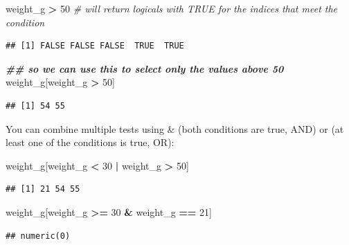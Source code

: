 \documentclass[
]{book}
\newenvironment{Shaded}{\begin{snugshade}}{\end{snugshade}}
\newcommand{\CommentTok}[1]{\textcolor[rgb]{0.56,0.35,0.01}{\textit{#1}}}
\newcommand{\DecValTok}[1]{\textcolor[rgb]{0.00,0.00,0.81}{#1}}
\newcommand{\DocumentationTok}[1]{\textcolor[rgb]{0.56,0.35,0.01}{\textbf{\textit{#1}}}}
\newcommand{\NormalTok}[1]{#1}
\newcommand{\SpecialCharTok}[1]{\textcolor[rgb]{0.81,0.36,0.00}{\textbf{#1}}}
\begin{document}
\begin{Shaded}
\begin{Highlighting}[]
\NormalTok{weight\_g }\SpecialCharTok{\textgreater{}} \DecValTok{50}    \CommentTok{\# will return logicals with TRUE for the indices that meet the condition}
\end{Highlighting}
\end{Shaded}

\begin{verbatim}
## [1] FALSE FALSE FALSE  TRUE  TRUE
\end{verbatim}

\begin{Shaded}
\begin{Highlighting}[]
\DocumentationTok{\#\# so we can use this to select only the values above 50}
\NormalTok{weight\_g[weight\_g }\SpecialCharTok{\textgreater{}} \DecValTok{50}\NormalTok{]}
\end{Highlighting}
\end{Shaded}

\begin{verbatim}
## [1] 54 55
\end{verbatim}

You can combine multiple tests using \& (both conditions are true, AND) or \textbar{} (at least one of the conditions is true, OR):

\begin{Shaded}
\begin{Highlighting}[]
\NormalTok{weight\_g[weight\_g }\SpecialCharTok{\textless{}} \DecValTok{30} \SpecialCharTok{|}\NormalTok{ weight\_g }\SpecialCharTok{\textgreater{}} \DecValTok{50}\NormalTok{]}
\end{Highlighting}
\end{Shaded}

\begin{verbatim}
## [1] 21 54 55
\end{verbatim}

\begin{Shaded}
\begin{Highlighting}[]
\NormalTok{weight\_g[weight\_g }\SpecialCharTok{\textgreater{}=} \DecValTok{30} \SpecialCharTok{\&}\NormalTok{ weight\_g }\SpecialCharTok{==} \DecValTok{21}\NormalTok{]}
\end{Highlighting}
\end{Shaded}

\begin{verbatim}
## numeric(0)
\end{verbatim}
\end{document}
